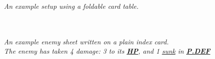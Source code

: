 \documentclass[12pt]{article}
\newcommand{\refto}[1]{\hyperlink{#1}{\textbf{#1}}}
\newcommand{\reftoit}[1]{\hyperlink{#1}{\emph{#1}}}
\begin{document}
\pagebreak

\begin{center}
\emph{An example setup using a foldable card table.}

\ \\ \ \\

\emph{An example enemy sheet written on a plain index card.\\
The enemy has taken 4 damage: 3 to its \refto{HP}, and 1 \reftoit{sunk} in \refto{P.DEF}}
\end{center}
\end{document}
